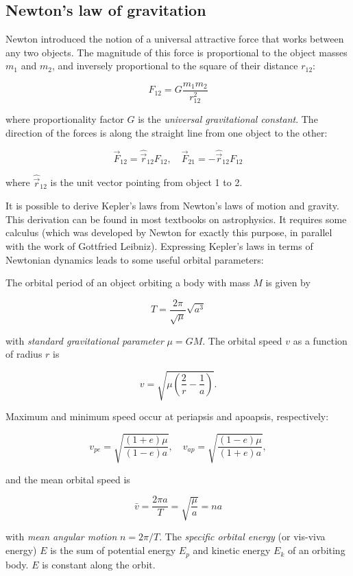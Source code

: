 \documentclass[Orbiter User Manual.tex]{subfiles}
\begin{document}
\subsection{Newton's law of gravitation}
Newton introduced the notion of a universal attractive force that works between
any two objects. The magnitude of this force is proportional to the object
masses $m_{1}$ and $m_{2}$, and inversely proportional to the square of their
distance $r_{12}$:

\[ F_{12} = G \frac{m_{1}m_{2}}{r_{12}^{2}} \]

where proportionality factor $G$ is the \emph{universal gravitational constant}.
The direction of the forces is along the straight line from one object to the
other:

\[ \vec{F}_{12} = \hat{\vec{r}}_{12} F_{12}, \quad \vec{F}_{21} = 
	-\hat{\vec{r}}_{12} F_{12} \]

where $\hat{\vec{r}}_{12}$ is the unit vector pointing from object 1 to 2.

It is possible to derive Kepler's laws from Newton's laws of motion and gravity.
This derivation can be found in most textbooks on astrophysics. It requires some
calculus (which was developed by Newton for exactly this purpose, in parallel
with the work of Gottfried Leibniz). Expressing Kepler's laws in terms of
Newtonian dynamics leads to some useful orbital parameters:

The orbital period of an object orbiting a body with mass $M$ is given by

\[ T = \frac{2 \pi}{\sqrt{\mu}} \sqrt{a^{3}} \]

with \emph{standard gravitational parameter} $\mu = GM$.
The orbital speed $v$ as a function of radius $r$ is

\[ v = \sqrt{\mu \left(\frac{2}{r} - \frac{1}{a}\right)}. \]

Maximum and minimum speed occur at periapsis and apoapsis, respectively:

\[ v_{pe} = \sqrt{\frac{(1 + e) \mu}{(1 - e) a}}, \quad v_{ap} =
	\sqrt{\frac{(1 - e) \mu}{(1 + e) a}}, \]

and the mean orbital speed is

\[ \bar{v} = \frac{2 \pi a}{T} = \sqrt{\frac{\mu}{a}} = n a \]

with \emph{mean angular motion} $n = 2 \pi / T$.
The \emph{specific orbital energy} (or vis-viva energy) $E$ is the sum of
potential energy $E_{p}$ and kinetic energy $E_{k}$ of an orbiting body. $E$ is
constant along the orbit.
\end{document}
